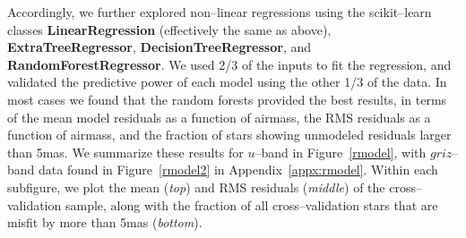 \documentclass[DM,toc]{lsstdoc}
\begin{document}
Accordingly, we further explored non--linear regressions using the
scikit--learn classes \textbf{LinearRegression} (effectively the same as
above), \textbf{ExtraTreeRegressor}, \textbf{DecisionTreeRegressor}, and
\textbf{RandomForestRegressor}.  We used 2/3 of the inputs to fit the
regression, and validated the predictive power of each model using the
other 1/3 of the data.  In most cases we found that the random forests
provided the best results, in terms of the mean model residuals as a
function of airmass, the RMS residuals as a function of airmass, and
the fraction of stars showing unmodeled residuals larger than 5mas.
We summarize these results for $u$--band in Figure~\ref{rmodel}, with
$griz$--band data found in Figure~\ref{rmodel2} in
Appendix~\ref{appx:rmodel}.  Within each subfigure, we plot the mean
(\textit{top}) and RMS residuals (\textit{middle}) of the cross--validation
sample, along with the fraction of all cross--validation stars that
are misfit by more than 5mas (\textit{bottom}).
\end{document}
